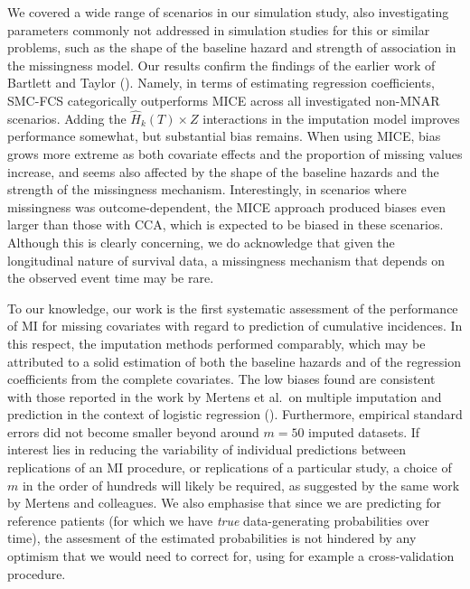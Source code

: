 \documentclass[
  letterpaper,
  DIV=11,
  numbers=noendperiod]{scrreprt}
\begin{document}
We covered a wide range of scenarios in our simulation study, also
investigating parameters commonly not addressed in simulation studies
for this or similar problems, such as the shape of the baseline hazard
and strength of association in the missingness model. Our results
confirm the findings of the earlier work of Bartlett and Taylor
(). Namely,
in terms of estimating regression coefficients, SMC-FCS categorically
outperforms MICE across all investigated non-MNAR scenarios. Adding the
\(\hat{H}_{k}(T) \times Z\) interactions in the imputation model
improves performance somewhat, but substantial bias remains. When using
MICE, bias grows more extreme as both covariate effects and the
proportion of missing values increase, and seems also affected by the
shape of the baseline hazards and the strength of the missingness
mechanism. Interestingly, in scenarios where missingness was
outcome-dependent, the MICE approach produced biases even larger than
those with CCA, which is expected to be biased in these scenarios.
Although this is clearly concerning, we do acknowledge that given the
longitudinal nature of survival data, a missingness mechanism that
depends on the observed event time may be rare.

To our knowledge, our work is the first systematic assessment of the
performance of MI for missing covariates with regard to prediction of
cumulative incidences. In this respect, the imputation methods performed
comparably, which may be attributed to a solid estimation of both the
baseline hazards and of the regression coefficients from the complete
covariates. The low biases found are consistent with those reported in
the work by Mertens et al.~on multiple imputation and prediction in the
context of logistic regression
(). Furthermore, empirical standard errors did not
become smaller beyond around \(m = 50\) imputed datasets. If interest
lies in reducing the variability of individual predictions between
replications of an MI procedure, or replications of a particular study,
a choice of \(m\) in the order of hundreds will likely be required, as
suggested by the same work by Mertens and colleagues. We also emphasise
that since we are predicting for reference patients (for which we have
\emph{true} data-generating probabilities over time), the assesment of
the estimated probabilities is not hindered by any optimism that we
would need to correct for, using for example a cross-validation
procedure.
\end{document}
